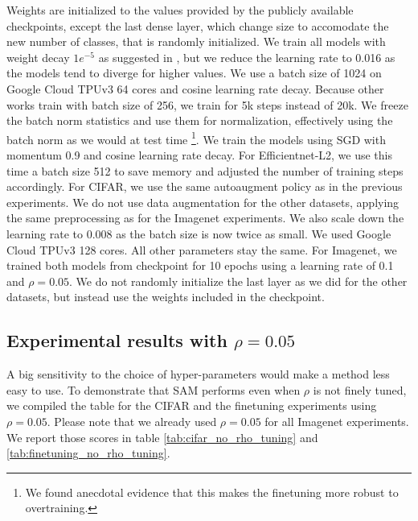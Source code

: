 \documentclass{article} %
\begin{document}
Weights are initialized to the values provided by the publicly available checkpoints, except the last dense layer, which change size to accomodate the new number of classes, that is randomly initialized. We train all models with weight decay $1e^{-5}$ as suggested in \citep{efficientnet}, but we reduce the learning rate to 0.016 as the models tend to diverge for higher values. We use a batch size of 1024 on Google Cloud TPUv3 64 cores and cosine learning rate decay. Because other works train with batch size of 256, we train for 5k steps instead of 20k. We freeze the batch norm statistics and use them for normalization, effectively using the batch norm as we would at test time \footnote{We found anecdotal evidence that this makes the finetuning more robust to overtraining.}. We train the models using SGD with momentum 0.9 and cosine learning rate decay. For Efficientnet-L2, we use this time a batch size 512 to save memory and adjusted the number of training steps accordingly.  For CIFAR, we use the same autoaugment policy as in the previous experiments. We do not use data augmentation for the other datasets, applying the same preprocessing as for the Imagenet experiments. We also scale down the learning rate to 0.008 as the batch size is now twice as small. We used Google Cloud TPUv3 128 cores. All other parameters stay the same.
For Imagenet, we trained both models from checkpoint for 10 epochs using a learning rate of 0.1 and $\rho=0.05$. We do not randomly initialize the last layer as we did for the other datasets, but instead use the weights included in the checkpoint.

\subsection{Experimental results with $\rho=0.05$}
\label{appendix:no_rho_tuning}
A big sensitivity to the choice of hyper-parameters would make a method less easy to use. To demonstrate that SAM performs even when $\rho$ is not finely tuned, we compiled the table for the CIFAR and the finetuning experiments using $\rho=0.05$. Please note that we already used $\rho=0.05$ for all Imagenet experiments. We report those scores in table \ref{tab:cifar_no_rho_tuning} and \ref{tab:finetuning_no_rho_tuning}.
\end{document}
